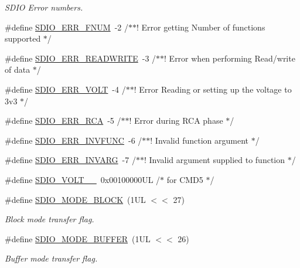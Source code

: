 \begin{DoxyCompactItemize}
\begin{DoxyCompactList}\small\item\em S\+D\+IO Error numbers. \end{DoxyCompactList}\item 
\#define \hyperlink{group___s_d_i_o__18_x_x__43_x_x_ga6f79f991e7b930ac27704feade59a3d6}{S\+D\+I\+O\+\_\+\+E\+R\+R\+\_\+\+F\+N\+UM}~-\/2 /$\ast$$\ast$! Error getting Number of functions supported $\ast$/
\item 
\#define \hyperlink{group___s_d_i_o__18_x_x__43_x_x_ga66fa67187ef08b5e46bbbc37bc8f617a}{S\+D\+I\+O\+\_\+\+E\+R\+R\+\_\+\+R\+E\+A\+D\+W\+R\+I\+TE}~-\/3 /$\ast$$\ast$! Error when performing Read/write of data $\ast$/
\item 
\#define \hyperlink{group___s_d_i_o__18_x_x__43_x_x_gaf48a8666f04e6fc2132bcb6ad7b72234}{S\+D\+I\+O\+\_\+\+E\+R\+R\+\_\+\+V\+O\+LT}~-\/4 /$\ast$$\ast$! Error Reading or setting up the voltage to 3v3 $\ast$/
\item 
\#define \hyperlink{group___s_d_i_o__18_x_x__43_x_x_ga9fa8f3cb769952116adde0a9d94213b4}{S\+D\+I\+O\+\_\+\+E\+R\+R\+\_\+\+R\+CA}~-\/5 /$\ast$$\ast$! Error during R\+CA phase $\ast$/
\item 
\#define \hyperlink{group___s_d_i_o__18_x_x__43_x_x_ga96b531be916d9edd9190f3cdfc7bfcc1}{S\+D\+I\+O\+\_\+\+E\+R\+R\+\_\+\+I\+N\+V\+F\+U\+NC}~-\/6 /$\ast$$\ast$! Invalid function argument $\ast$/
\item 
\#define \hyperlink{group___s_d_i_o__18_x_x__43_x_x_ga2f5a9d212a1e07e45bb141e3202a104b}{S\+D\+I\+O\+\_\+\+E\+R\+R\+\_\+\+I\+N\+V\+A\+RG}~-\/7 /$\ast$$\ast$! Invalid argument supplied to function $\ast$/
\item 
\#define \hyperlink{group___s_d_i_o__18_x_x__43_x_x_gaaf155138523c5eeac75f915883f6de2e}{S\+D\+I\+O\+\_\+\+V\+O\+L\+T\+\_\+\_}~0x00100000\+U\+L  /$\ast$ for C\+M\+D5 $\ast$/
\item 
\#define \hyperlink{group___s_d_i_o__18_x_x__43_x_x_gaf7c4f9dbe3ed7f3e4f98c8e811bf0658}{S\+D\+I\+O\+\_\+\+M\+O\+D\+E\+\_\+\+B\+L\+O\+CK}~(1\+U\+L $<$$<$ 27)
\begin{DoxyCompactList}\small\item\em Block mode transfer flag. \end{DoxyCompactList}\item 
\#define \hyperlink{group___s_d_i_o__18_x_x__43_x_x_gacfb2f991cf5339b325520be169aa90d8}{S\+D\+I\+O\+\_\+\+M\+O\+D\+E\+\_\+\+B\+U\+F\+F\+ER}~(1\+U\+L $<$$<$ 26)
\begin{DoxyCompactList}\small\item\em Buffer mode transfer flag. \end{DoxyCompactList}\item 

\end{DoxyCompactItemize}
